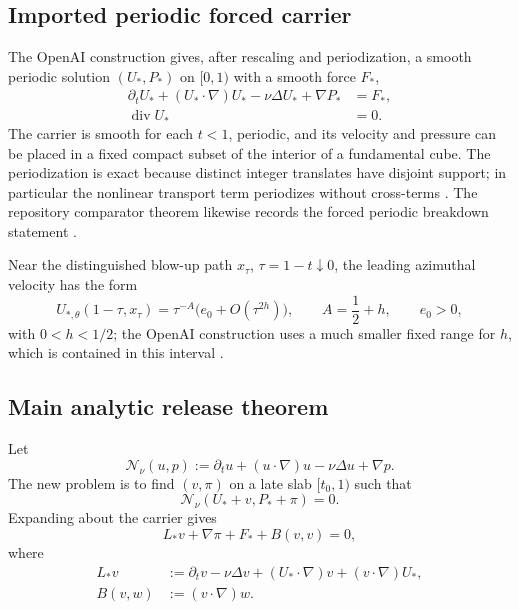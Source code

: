 \documentclass[11pt]{article}
\numberwithin{equation}{section}
\newcommand{\N}{\mathcal N}
\newcommand{\diver}{\operatorname{div}}
\begin{document}
\subsection{Imported periodic forced carrier}
The OpenAI construction gives, after rescaling and periodization, a smooth periodic solution \((U_*,P_*)\) on \([0,1)\) with a smooth force \(F_*\),
\begin{align}
\partial_tU_*+(U_*\cdot\nabla)U_* -\nu\Delta U_*+\nabla P_*&=F_*,\label{eq:forcedcarrier}\\
\diver U_*&=0.\label{eq:forceddiv}
\end{align}
The carrier is smooth for each \(t<1\), periodic, and its velocity and pressure can be placed in a fixed compact subset of the interior of a fundamental cube.  The periodization is exact because distinct integer translates have disjoint support; in particular the nonlinear transport term periodizes without cross-terms \cite[Cor.~10.6]{OpenAI2026NS}.  The repository comparator theorem likewise records the forced periodic breakdown statement \cite{OpenAIRepo2026}.

Near the distinguished blow-up path \(x_\tau\), \(\tau=1-t\downarrow0\), the leading azimuthal velocity has the form
\begin{equation}
U_{*,\theta}(1-\tau,x_\tau)=\tau^{-A}\bigl(e_0+O(\tau^{2h})\bigr),
\qquad
A=\frac12+h,
\qquad e_0>0,
\label{eq:carrierblow}
\end{equation}
with \(0<h<1/2\); the OpenAI construction uses a much smaller fixed range for \(h\), which is contained in this interval \cite{OpenAI2026NS}.

\subsection{Main analytic release theorem}
Let
\begin{equation}
\N_\nu(u,p):=\partial_tu+(u\cdot\nabla)u-\nu\Delta u+\nabla p.
\label{eq:residualdef}
\end{equation}
The new problem is to find \((v,\pi)\) on a late slab \([t_0,1)\) such that
\begin{equation}
\N_\nu(U_*+v,P_*+\pi)=0.
\label{eq:exactgoal}
\end{equation}
Expanding about the carrier gives
\begin{equation}
L_*v+\nabla\pi+F_*+B(v,v)=0,
\label{eq:expanded}
\end{equation}
where
\begin{align}
L_*v&:=\partial_tv-\nu\Delta v+(U_*\cdot\nabla)v+(v\cdot\nabla)U_*,\label{eq:linearized}\\
B(v,w)&:=(v\cdot\nabla)w.\label{eq:bilinear}
\end{align}
\end{document}
